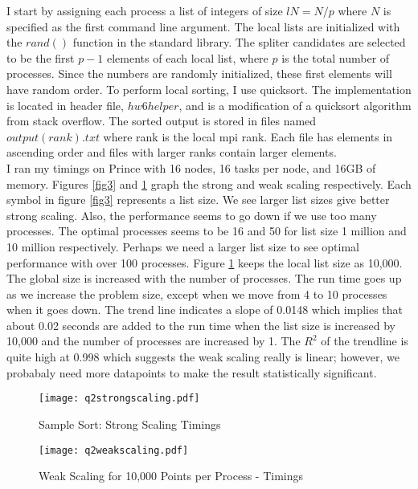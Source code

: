 \documentclass[10pt]{article}
\begin{document}
I start by assigning each process a list of integers of size  $lN = N/p$ where $N$ is specified as the first command line argument. The local lists are initialized with the $rand()$ function in the standard library. The spliter candidates are selected to be the first $p-1$ elements of each local list, where $p$ is the total number of processes. Since the numbers are randomly initialized, these first elements will have random order. To perform local sorting, I use quicksort. The implementation is located in header file, $hw6helper$, and is a modification of a quicksort algorithm from stack overflow. The sorted output is stored in files named $output(rank).txt$ where rank is the local mpi rank. Each file has elements in ascending order and files with larger ranks contain larger elements.\\

I ran my timings on Prince with 16 nodes, 16 tasks per node, and 16GB of memory. Figures \ref{fig3} and \ref{fig4} graph the strong and weak scaling respectively. Each symbol in figure \ref{fig3} represents a list size. We see larger list sizes give better strong scaling. Also, the performance seems to go down if we use too many processes. The optimal processes seems to be 16 and 50 for list size 1 million and 10 million respectively. Perhaps we need a larger list size to see optimal performance with over 100 processes. Figure \ref{fig4} keeps the local list size as 10,000. The global size is increased with the number of processes. The run time goes up as we increase the problem size, except when we move from 4 to 10 processes when it goes down. The trend line indicates a slope of 0.0148 which implies that about 0.02 seconds are added to the run time when the list size is increased by 10,000 and the number of processes are increased by 1. The $R^2$ of the trendline is quite high at 0.998 which suggests the weak scaling really is linear; however, we probabaly need more datapoints to make the result statistically significant.

\lipsum

\begin{figure}[!h]
    \centering
    \begin{minipage}{0.45\textwidth}
        \centering
        \texttt{[image: q2strongscaling.pdf]} %
        \caption{Sample Sort: Strong Scaling Timings}
        \label{fig3}
    \end{minipage}\hfill
         \begin{minipage}{0.45\textwidth}
        \centering
        \texttt{[image: q2weakscaling.pdf]} %
        \caption{Weak Scaling for 10,000 Points per Process - Timings}
        \label{fig4}
    \end{minipage}
\end{figure}
\end{document}
